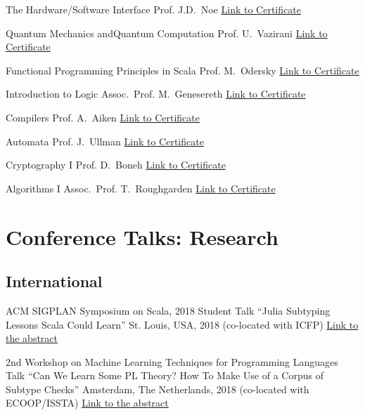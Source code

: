 \documentclass[11pt,a4paper]{moderncv}   %
\newcommand{\myhref}[2]{\textcolor{blue}{\href{#1}{#2}}}
\begin{document}
{\footnotesize
{}
	{The Hardware/Software Interface}
	{Prof. J.D.~Noe}{}{}
	{\myhref{http://mmcs.sfedu.ru/~ulysses/Edu/coursera/hwsw.pdf}
	{Link to Certificate}}

	{Quantum Mechanics andQuantum Computation}
	{Prof. U.~Vazirani}{}{}
	{\myhref{http://mmcs.sfedu.ru/~ulysses/Edu/coursera/qmqc.pdf}
	{Link to Certificate}}

	{Functional Programming Principles
in Scala}
	{Prof. M.~Odersky}{}{}
	{\myhref{http://mmcs.sfedu.ru/~ulysses/Edu/coursera/progfun.pdf}
	{Link to Certificate}}

	{Introduction to Logic}
	{Assoc.~Prof. M.~Genesereth}{}{}
	{\myhref{http://mmcs.sfedu.ru/~ulysses/Edu/coursera/intrologic.pdf}
	{Link to Certificate}}

	{Compilers}
	{Prof. A.~Aiken}
	{}{}{\myhref{http://mmcs.sfedu.ru/~ulysses/Edu/coursera/compilers.pdf}
	{Link to Certificate}}

	{Automata}
	{Prof. J.~Ullman}{}{}
	{\myhref{http://mmcs.sfedu.ru/~ulysses/Edu/coursera/automata.pdf}
	{Link to Certificate}}

	{Cryptography I}
	{Prof. D.~Boneh}{}{}
	{\myhref{http://mmcs.sfedu.ru/~ulysses/Edu/coursera/crypto-I.pdf}
	{Link to Certificate}}

	{Algorithms I}
	{Assoc.~Prof. T.~Roughgarden}{}{}
	{\myhref{http://mmcs.sfedu.ru/~ulysses/Edu/coursera/algo-I.pdf}
	{Link to Certificate}}
}

\section{Conference Talks: Research}

\subsection{International}

%
    {ACM SIGPLAN Symposium on Scala, 2018}%
    {Student Talk ``Julia Subtyping Lessons Scala Could Learn''}
    {St. Louis, USA, 2018 (co-located with ICFP)}{}%
    {\myhref{%
https://conf.researchr.org/event/scala-2018/scala-2018-papers-julia-subtyping-lessons-scala-could-learn-student-talk-}{Link to the abstract}}


%
    {2nd Workshop on Machine Learning Techniques for Programming Languages}%
    {Talk ``Can We Learn Some PL Theory? How To Make Use of a Corpus of Subtype Checks''}
    {Amsterdam, The Netherlands, 2018 (co-located with ECOOP/ISSTA)}{}%
    {\myhref{%
https://conf.researchr.org/event/ecoop-issta-2018/ml4pl-2018-papers-can-we-learn-some-pl-theory-how-to-make-use-of-a-corpus-of-subtype-checks}{Link to the abstract}}
\end{document}
